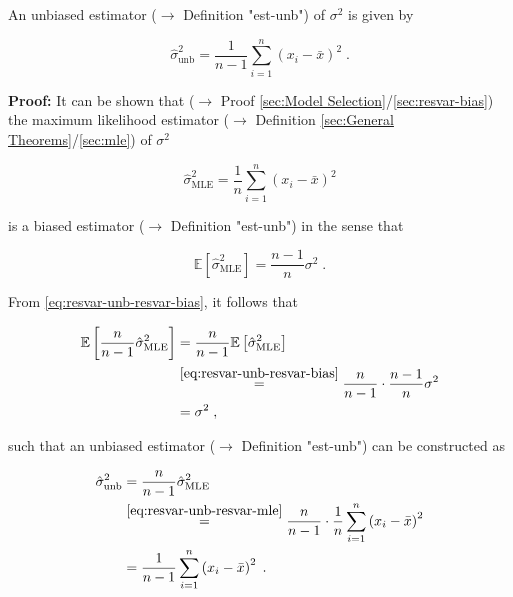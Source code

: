 \documentclass[a4paper,12pt,twoside]{book}
\begin{document}
An unbiased estimator ($\rightarrow$ Definition "est-unb") of $\sigma^2$ is given by

\begin{equation} \label{eq:resvar-unb-resvar-unb}
\hat{\sigma}^2_{\mathrm{unb}} = \frac{1}{n-1} \sum_{i=1}^{n} \left( x_i - \bar{x} \right)^2 \; .
\end{equation}


\vspace{1em}
\textbf{Proof:} It can be shown that ($\rightarrow$ Proof \ref{sec:Model Selection}/\ref{sec:resvar-bias}) the maximum likelihood estimator ($\rightarrow$ Definition \ref{sec:General Theorems}/\ref{sec:mle}) of $\sigma^2$

\begin{equation} \label{eq:resvar-unb-resvar-mle}
\hat{\sigma}^2_{\mathrm{MLE}} = \frac{1}{n} \sum_{i=1}^{n} \left( x_i - \bar{x} \right)^2
\end{equation}

is a biased estimator ($\rightarrow$ Definition "est-unb") in the sense that

\begin{equation} \label{eq:resvar-unb-resvar-bias}
\mathbb{E}\left[ \hat{\sigma}^2_{\mathrm{MLE}} \right] = \frac{n-1}{n} \sigma^2 \; .
\end{equation}

From \eqref{eq:resvar-unb-resvar-bias}, it follows that

\begin{equation} \label{eq:resvar-unb-resvar-bias-adj}
\begin{split}
\mathbb{E}\left[ \frac{n}{n-1} \hat{\sigma}^2_{\mathrm{MLE}} \right] &= \frac{n}{n-1} \mathbb{E}\left[ \hat{\sigma}^2_{\mathrm{MLE}} \right] \\
&\overset{\eqref{eq:resvar-unb-resvar-bias}}{=} \frac{n}{n-1} \cdot \frac{n-1}{n} \sigma^2 \\
&= \sigma^2 \; ,
\end{split}
\end{equation}

such that an unbiased estimator ($\rightarrow$ Definition "est-unb") can be constructed as

\begin{equation} \label{eq:resvar-unb-resvar-unb-qed}
\begin{split}
\hat{\sigma}^2_{\mathrm{unb}} &= \frac{n}{n-1} \hat{\sigma}^2_{\mathrm{MLE}} \\
&\overset{\eqref{eq:resvar-unb-resvar-mle}}{=} \frac{n}{n-1} \cdot \frac{1}{n} \sum_{i=1}^{n} \left( x_i - \bar{x} \right)^2 \\
&= \frac{1}{n-1} \sum_{i=1}^{n} \left( x_i - \bar{x} \right)^2 \; .
\end{split}
\end{equation}
\end{document}
